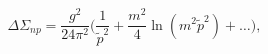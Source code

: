 \begin{equation}
 \Delta \Sigma_{np}=\frac{g^2}{24\pi^2}\Big(\frac1{\tilde p^2} 
 +\frac{m^2}4
 \ln(m^2\tilde p^2) + \dots\Big), \label{divergence}
\end{equation}

